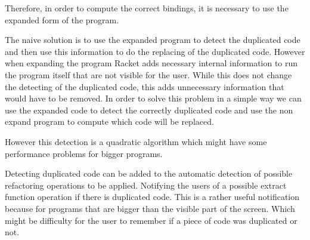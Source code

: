 
Therefore, in order to compute the correct bindings, it is necessary to use the expanded form
of the program.

The naive solution is to use the expanded program to detect the duplicated
 code and then use this information to do the replacing of the duplicated code.
However when expanding the program Racket adds necessary internal information to
run the program itself that are not visible for the user.
While this does not change the detecting of the duplicated code, this adds unnecessary information
that would have to be removed. %
In order to solve this problem in a simple way we can use the expanded code to detect
the correctly duplicated code and use the non expand program
to compute which code will be replaced.

However this detection is a quadratic algorithm which might
have some performance problems for bigger programs. %

Detecting duplicated code can be added to the automatic detection of possible refactoring operations to be applied. %
Notifying the users of a possible extract function operation if there is duplicated code.
This is a rather useful notification because for programs that are bigger than the
visible part of the screen.
Which might be difficulty for the user to remember if a piece of code was duplicated or not.





